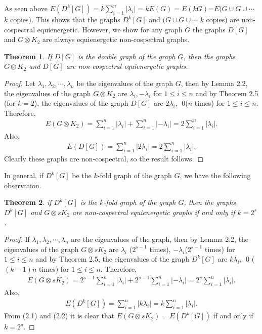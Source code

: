 \documentclass[12pt,a4paper]{amsart}
\newtheorem{theorem}{Theorem}[section]
\theoremstyle{theorem}
\theoremstyle{definition}
\numberwithin{equation}{section} \makeatletter
\begin{document}
\indent As seen above $E(D^k[G])=k\sum_{i=1}^{n}|\lambda_i|=kE(G)=E(kG)$=$E(G\cup G\cup\cdots$ $k$ copies). This shows that the graphs $D^k[G]$ and $(G\cup G\cup\cdots$ $k$ copies) are non-cospectral equienergetic. However, we show for any graph $G$ the graphs $D[G]$ and $G\otimes K_2$ are always equienergetic non-cospectral graphs.
\begin{theorem}
If $D[G]$ is the double graph of the graph $G$, then the graphs $G\otimes K_2$ and $D[G]$ are non-cospectral equienergetic graphs.
\end{theorem}
\begin{proof}
Let $\lambda_1, \lambda_2, \cdots, \lambda_n$ be the eigenvalues of the graph $G$, then by Lemma 2.2, the eigenvalues of the graph $G\otimes K_2$ are $\lambda_i, -\lambda_i$ for $1\leq i\leq n$ and by Theorem 2.5 (for $k=2$), the eigenvalues of the graph $D[G]$ are $2\lambda_i,~~ 0$($n$ times) for $1\leq i\leq n$. Therefore,
\begin{align*}
E(G\otimes K_2)=\sum\limits_{i=1}^{n}|\lambda_i|+\sum\limits_{i=1}^{n}|-\lambda_i|=2\sum\limits_{i=1}^{n}|\lambda_i|.
\end{align*}
Also,
\begin{align*}
E(D[G])=\sum\limits_{i=1}^{n}|2\lambda_i|=2\sum\limits_{i=1}^{n}|\lambda_i|.
\end{align*}
\indent Clearly these graphs are non-cospectral, so the result follows.
\end{proof}
\indent In general, if $D^k[G]$ be the $k$-fold graph of the graph $G$, we have the following observation.
\begin{theorem}
if $D^k[G]$ is the $k$-fold graph of the graph $G$, then the graphs $D^k[G]$ and $G\otimes sK_2$ are non-cospectral equienergetic graphs if and only if $k=2^s$.
\end{theorem}
\begin{proof}
If $\lambda_1, \lambda_2, \cdots, \lambda_n$ are the eigenvalues of the graph, then by Lemma 2.2, the eigenvalues of the graph $G\otimes sK_2$ are $\lambda_i$ ($2^{s-1}$ times), $-\lambda_i $($2^{s-1}$ times) for $1\leq i\leq n$ and by Theorem 2.5, the eigenvalues of the graph $D^k[G]$ are $k\lambda_i,~~ 0$ ($(k-1)n$ times) for $1\leq i\leq n$. Therefore,
\begin{align}
E(G\otimes sK_2)=2^{s-1}\sum\limits_{i=1}^{n}|\lambda_i|+2^{s-1}\sum\limits_{i=1}^{n}|-\lambda_i|=2^s\sum\limits_{i=1}^{n}|\lambda_i|.
\end{align}
Also,
\begin{align}
E(D^k[G])=\sum\limits_{i=1}^{n}|k\lambda_i|=k\sum\limits_{i=1}^{n}|\lambda_i|.
\end{align}
From (2.1) and (2.2) it is clear that $E(G\otimes s K_2)=E(D^k[G])$ if and only if $k=2^s$.
\end{proof}
\end{document}
